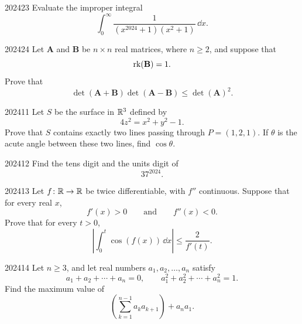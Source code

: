 \begin{problem}{2024}{2}{3}
Evaluate the improper integral
\[
    \int_0^\infty
    \frac{1}{(x^{2024}+1)(x^2+1)}\, \dd x.
\]
\end{problem}

\begin{problem}{2024}{2}{4}
Let $\mathbf A$ and $\mathbf B$ be $n\times n$ real matrices, where $n\ge2$, and suppose that
\[
    \operatorname{rk}(\mathbf B)=1.
\]
Prove that
\[
    \det(\mathbf A+\mathbf B)\det(\mathbf A-\mathbf B)
    \le
    \det(\mathbf A)^2.
\]
\end{problem}

\begin{problem}{2024}{1}{1}
Let $S$ be the surface in $\mathbb{R}^3$ defined by
\[
    4z^2=x^2+y^2-1.
\]
Prove that $S$ contains exactly two lines passing through $P=(1, 2, 1)$. If $\theta$ is the acute angle between these two lines, find $\cos\theta$.
\end{problem}

\begin{problem}{2024}{1}{2}
Find the tens digit and the units digit of
\[
    37^{2024}.
\]
\end{problem}

\begin{problem}{2024}{1}{3}
Let $f\colon\mathbb{R}\to\mathbb{R}$ be twice differentiable, with $f''$ continuous. Suppose that for every real $x$,
\[
    f'(x)>0
    \qquad\text{and}\qquad
    f''(x)<0.
\]
Prove that for every $t>0$,
\[
    \left|
        \int_0^t\cos(f(x))\, \dd x
    \right|
    \le
    \frac{2}{f'(t)}.
\]
\end{problem}

\begin{problem}{2024}{1}{4}
Let $n\ge3$, and let real numbers $a_1, a_2, \dots, a_n$ satisfy
\[
    a_1+a_2+\cdots+a_n=0,
    \qquad
    a_1^2+a_2^2+\cdots+a_n^2=1.
\]
Find the maximum value of
\[
    \left(\sum_{k=1}^{n-1}a_ka_{k+1}\right)+a_na_1.
\]
\end{problem}
